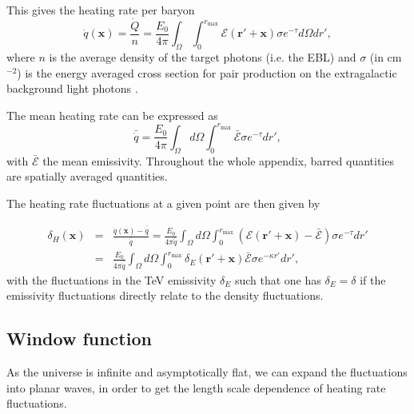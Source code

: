 \documentclass[twocolumns]{emulateapj}
\begin{document}
This gives the  heating rate per baryon
\begin{equation}
  \label{eq:heating_rate0}
  \dot{q}(\mathbf{x})=\frac{\dot{Q}}{n}= \frac{E_0}{4\pi}  \int_{\Omega}\int_0^{r_{\mathrm{max}}}   \mathcal{E}(\mathbf{r}'+\mathbf{x})\sigma  e^{-\tau}d\Omega dr' ,
\end{equation}
where $n$ is the average density of the target photons (i.e. the EBL) and $\sigma$ (in cm$^{-2}$) is the energy averaged cross section for pair production on the extragalactic background light photons \citep{1967PhRv..155.1408G}. 


The mean heating rate can be expressed as
\begin{equation}
  \label{eq:heating_rate0}
  \bar{\dot{q}}=\frac{E_0}{4\pi} \int_{\Omega}d\Omega\int_0^{r_{\mathrm{max}}}  \bar{\mathcal{E}}\sigma  e^{-\tau}dr', 
\end{equation}
with $\bar{\mathcal{E}}$ the mean emissivity. Throughout the whole appendix, barred quantities are spatially averaged quantities.

The heating rate fluctuations at a given point are then given by 

\begin{eqnarray}
  \label{eq:heat_fluc_newt0}
  \delta_H(\mathbf{x})&=&\frac{\dot{q}(\mathbf{x})-\bar{\dot{q}}}{\bar{\dot{q}}}=\frac{E_0}{4\pi\bar{\dot{q}}} \int_{\Omega}d\Omega\int_0^{r_{\mathrm{max}}}   (\mathcal{E}(\mathbf{r}'+\mathbf{x})-\bar{\mathcal{E}}) \sigma  e^{-\tau} dr' \\ \nonumber
  &=&\frac{E_0}{4\pi\bar{\dot{q}}}\int_{\Omega}d\Omega\int_0^{r_{\mathrm{max}}}   \delta_E(\mathbf{r}'+\mathbf{x})\bar{\mathcal{E}}\sigma  e^{-\kappa r'}dr',
\end{eqnarray}
with the fluctuations in the TeV emissivity $\delta_E$ such that one has $\delta_E=\delta$ if the emissivity fluctuations directly relate to the density fluctuations.

\subsection{Window function}
As the universe is infinite and asymptotically flat, we can expand the fluctuations into planar waves, in order to get the length scale dependence of heating rate fluctuations.
\end{document}
